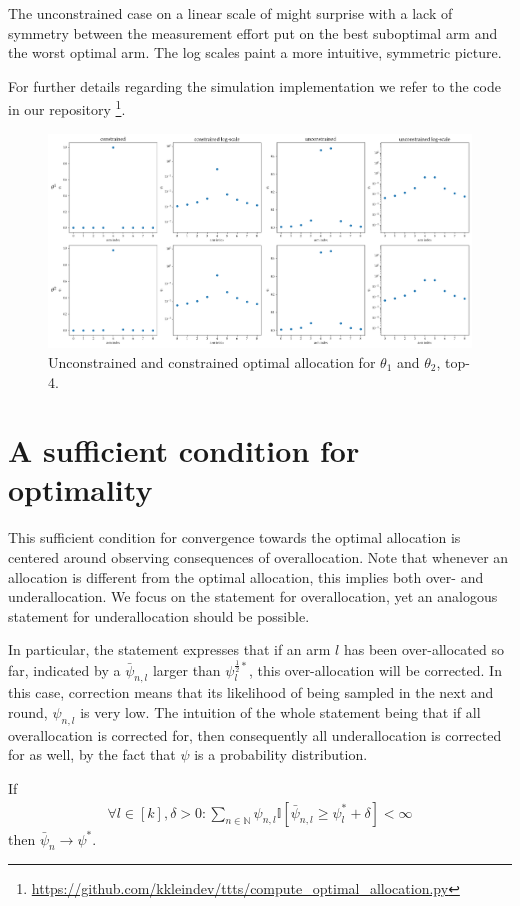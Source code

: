 The unconstrained case on a linear scale of  might
surprise with a lack of symmetry between the measurement effort put on the best
suboptimal arm and the worst optimal arm. The log scales paint a more intuitive,
symmetric picture.

For further details regarding the simulation implementation we refer to the code
in our repository
\footnote{\url{https://github.com/kkleindev/ttts/compute_optimal_allocation.py}}.

\begin{figure}[h]
  \centering
  \includegraphics[width=\textwidth]{optimal_allocation.png}
  \caption{Unconstrained and constrained optimal allocation for $\theta_1$ and $\theta_2$, top-4.}
  \label{fig:optimal_allocation}
\end{figure}

\section{A sufficient condition for
    optimality}\label{section:optimality_sufficient_condition}
This sufficient condition for convergence towards the optimal allocation is
centered around observing consequences of overallocation. Note that whenever an
allocation is different from the optimal allocation, this implies both over- and
underallocation. We focus on the statement for overallocation, yet an analogous
statement for underallocation should be possible.

In particular, the statement expresses that if an arm $l$ has been
over-allocated so far, indicated by a $\bar{\psi}_{n, l}$ larger than
$\psi^{\frac{1}{2}*}_l$, this over-allocation will be corrected. In this case,
correction means that its likelihood of being sampled in the next and round,
$\psi_{n, l}$ is very low. The intuition of the whole statement being that if
all overallocation is corrected for, then consequently all underallocation is
corrected for as well, by the fact that $\psi$ is a probability distribution.
\begin{proposition}\label{proposition:optimality_sufficient_condition}
  If
  \begin{align}
    \forall l \in [k], \delta > 0: \sum_{n \in \mathbb{N}} \psi_{n, l}
        \mathbb{I}[\bar{\psi}_{n, l} \geq \psi^*_l + \delta] < \infty
        \label{eq:sufficient_condition}
  \end{align}
  then $\bar{\psi}_{n} \rightarrow \psi^*$.
\end{proposition}

